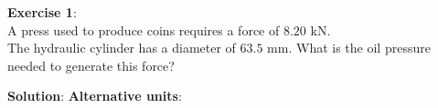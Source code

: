 \documentclass[10pt]{amsart}
\begin{document}
\begin{minipage}[t]{0.45\textwidth}
	\raggedright
	\textbf{Exercise 1}:\\
		A press used to produce coins requires a force of $8.20\text{ kN}$.\\
		The hydraulic cylinder has
		a diameter of $63.5\text{ mm}$. \parb
		What is the oil pressure needed to generate this force?
	\par\vspace{3.25cm}
\end{minipage}
\hfill
\begin{minipage}[t]{0.5\textwidth}
	\textbf{Solution}:
	\parm
	\parb
	\textbf{Alternative units}:
	\parm
\end{minipage}
\vfill 
\newpage
\end{document}
